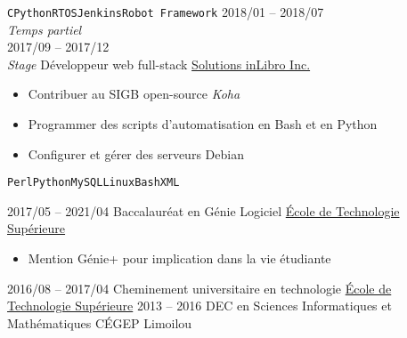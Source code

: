 \documentclass[9pt]{developercv} %
\begin{document}
\begin{minipage}[t]{0.8\textwidth}
\begin{entrylist}
{			\texttt{C}\slashsep\texttt{Python}\slashsep\texttt{RTOS}\slashsep\texttt{Jenkins}\slashsep\texttt{Robot Framework}
		}
	\entry
		{2018/01 -- 2018/07\\{\small\emph{Temps partiel}}\\2017/09 -- 2017/12\\{\small\emph{Stage}}}
		{Développeur web full-stack}
		{\href{https://inlibro.com/}{Solutions inLibro Inc.}}
		{
			\vspace{-14pt}
			\begin{itemize}
				\renewcommand{\labelitemi}{\raisebox{.45ex}{\rule{.6ex}{.6ex}}}
				\setlength\itemsep{-1pt}
				\item Contribuer au SIGB open-source \emph{Koha}
				\item Programmer des scripts d'automatisation en Bash et en Python
				\item Configurer et gérer des serveurs Debian
			\end{itemize}
			\vspace{-4pt}
			\texttt{Perl}\slashsep\texttt{Python}\slashsep\texttt{MySQL}\slashsep\texttt{Linux}\slashsep\texttt{Bash}\slashsep\texttt{XML}
		}
\end{entrylist}



\begin{entrylist}
	\setlength\itemsep{-1pt}
	\entry
		{2017/05 -- 2021/04}
		{Baccalauréat en Génie Logiciel}
		{\href{https://etsmtl.ca}{École de Technologie Supérieure}}
		{
			\vspace{-14pt}
			\begin{itemize}
				\renewcommand{\labelitemi}{\raisebox{.45ex}{\rule{.6ex}{.6ex}}}
				\setlength\itemsep{-1pt}
				\item Mention Génie+ pour implication dans la vie étudiante
			\end{itemize}
			\vspace{-8pt}
		}
	\entry
		{2016/08 -- 2017/04}
		{Cheminement universitaire en technologie}
		{\href{https://etsmtl.ca}{École de Technologie Supérieure}}
		{\vspace{-14pt}}
	\entry
		{2013 -- 2016}
		{DEC en Sciences Informatiques et Mathématiques}
		{CÉGEP Limoilou}
		{\vspace{-14pt}}
\end{entrylist}


\end{minipage}
\end{document}
